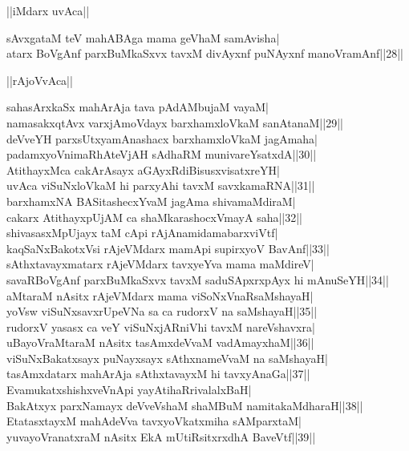 \documentclass{article}
\begin{document}
\begin{center}
||iMdarx uvAca||
\end{center}

sAvxgataM teV mahABAga mama geVhaM samAvisha|\\
atarx BoVgAnf parxBuMkaSxvx tavxM divAyxnf puNAyxnf manoVramAnf||28||\\

\begin{center}
||rAjoVvAca||
\end{center}

sahasArxkaSx mahArAja tava pAdAMbujaM vayaM|\\
namasakxqtAvx varxjAmoVdayx barxhamxloVkaM sanAtanaM||29||\\
deVveYH parxsUtxyamAnashacx barxhamxloVkaM jagAmaha|\\
padamxyoVnimaRhAteVjAH sAdhaRM munivareYsatxdA||30||\\
AtithayxMca cakArAsayx aGAyxRdiBisusxvisatxreYH|\\
uvAca viSuNxloVkaM hi parxyAhi tavxM savxkamaRNA||31||\\
barxhamxNA BASitashecxYvaM jagAma shivamaMdiraM|\\
cakarx AtithayxpUjAM ca shaMkarashocxVmayA saha||32||\\
shivasasxMpUjayx taM cApi rAjAnamidamabarxviVtf|\\
kaqSaNxBakotxVsi rAjeVMdarx mamApi supirxyoV BavAnf||33||\\
sAthxtavayxmatarx rAjeVMdarx tavxyeYva mama maMdireV|\\
savaRBoVgAnf parxBuMkaSxvx tavxM saduSApxrxpAyx hi mAnuSeYH||34||\\
aMtaraM nAsitx rAjeVMdarx mama viSoNxVnaRsaMshayaH|\\
yoVsw viSuNxsavxrUpeVNa sa ca rudorxV na saMshayaH||35||\\
rudorxV yasasx ca veY viSuNxjARniVhi tavxM nareVshavxra|\\
uBayoVraMtaraM nAsitx tasAmxdeVvaM vadAmayxhaM||36||\\
viSuNxBakatxsayx puNayxsayx sAthxnameVvaM na saMshayaH|\\
tasAmxdatarx mahArAja sAthxtavayxM hi tavxyAnaGa||37||\\
EvamukatxshishxveVnApi yayAtihaRrivalalxBaH|\\
BakAtxyx parxNamayx deVveVshaM shaMBuM namitakaMdharaH||38||\\
EtatasxtayxM mahAdeVva tavxyoVkatxmiha sAMparxtaM|\\
yuvayoVranatxraM nAsitx EkA mUtiRsitxrxdhA BaveVtf||39||\\
\end{document}
